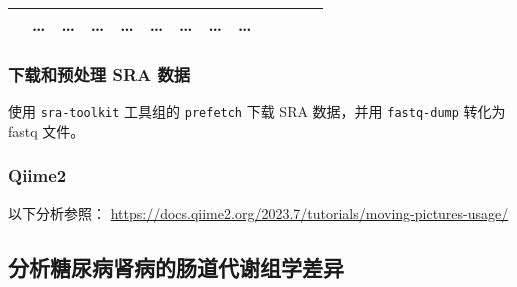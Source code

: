 \documentclass[
]{article}
\begin{document}
\begin{longtable}[]{@{}lllllllllllll@{}}
\begin{minipage}[t]{0.05\columnwidth}
\end{minipage} & \begin{minipage}[t]{0.05\columnwidth}\raggedright
\ldots{}\strut
\end{minipage} & \begin{minipage}[t]{0.05\columnwidth}\raggedright
\ldots{}\strut
\end{minipage} & \begin{minipage}[t]{0.05\columnwidth}\raggedright
\ldots{}\strut
\end{minipage} & \begin{minipage}[t]{0.05\columnwidth}\raggedright
\ldots{}\strut
\end{minipage} & \begin{minipage}[t]{0.05\columnwidth}\raggedright
\ldots{}\strut
\end{minipage} & \begin{minipage}[t]{0.05\columnwidth}\raggedright
\ldots{}\strut
\end{minipage} & \begin{minipage}[t]{0.08\columnwidth}\raggedright
\ldots{}\strut
\end{minipage} & \begin{minipage}[t]{0.02\columnwidth}\raggedright
\ldots{}\strut
\end{minipage}\tabularnewline
\bottomrule
\end{longtable}

\hypertarget{ux4e0bux8f7dux548cux9884ux5904ux7406-sra-ux6570ux636e}{%
\subsubsection{下载和预处理 SRA 数据}\label{ux4e0bux8f7dux548cux9884ux5904ux7406-sra-ux6570ux636e}}

使用 \texttt{sra-toolkit} 工具组的 \texttt{prefetch} 下载 SRA 数据，并用 \texttt{fastq-dump} 转化为 fastq 文件。

\hypertarget{qiime2}{%
\subsubsection{Qiime2}\label{qiime2}}

以下分析参照： \url{https://docs.qiime2.org/2023.7/tutorials/moving-pictures-usage/}

\hypertarget{ux5206ux6790ux7cd6ux5c3fux75c5ux80beux75c5ux7684ux80a0ux9053ux4ee3ux8c22ux7ec4ux5b66ux5deeux5f02}{%
\subsection{分析糖尿病肾病的肠道代谢组学差异}\label{ux5206ux6790ux7cd6ux5c3fux75c5ux80beux75c5ux7684ux80a0ux9053ux4ee3ux8c22ux7ec4ux5b66ux5deeux5f02}}
\end{document}
